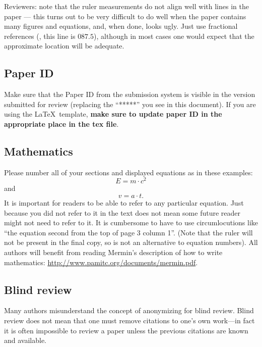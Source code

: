 Reviewers:
note that the ruler measurements do not align well with lines in the paper --- this turns out to be very difficult to do well when the paper contains many figures and equations, and, when done, looks ugly.
Just use fractional references (\eg, this line is $087.5$), although in most cases one would expect that the approximate location will be adequate.


\subsection{Paper ID}
Make sure that the Paper ID from the submission system is visible in the version submitted for review (replacing the ``*****'' you see in this document).
If you are using the \LaTeX\ template, \textbf{make sure to update paper ID in the appropriate place in the tex file}.


\subsection{Mathematics}

Please number all of your sections and displayed equations as in these examples:
\begin{equation}
  E = m\cdot c^2
  \label{eq:important}
\end{equation}
and
\begin{equation}
  v = a\cdot t.
  \label{eq:also-important}
\end{equation}
It is important for readers to be able to refer to any particular equation.
Just because you did not refer to it in the text does not mean some future reader might not need to refer to it.
It is cumbersome to have to use circumlocutions like ``the equation second from the top of page 3 column 1''.
(Note that the ruler will not be present in the final copy, so is not an alternative to equation numbers).
All authors will benefit from reading Mermin's description of how to write mathematics:
\url{http://www.pamitc.org/documents/mermin.pdf}.

\subsection{Blind review}

Many authors misunderstand the concept of anonymizing for blind review.
Blind review does not mean that one must remove citations to one's own work---in fact it is often impossible to review a paper unless the previous citations are known and available.


